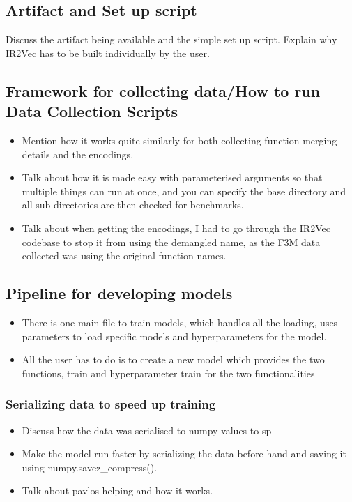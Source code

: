 \subsection{Artifact and Set up script}
Discuss the artifact being available and the simple set up script. Explain why IR2Vec has to be built individually by the user.

\subsection{Framework for collecting data/How to run Data Collection Scripts}
\begin{itemize}
    \item Mention how it works quite similarly for both collecting function merging details and the encodings.
    \item Talk about how it is made easy with parameterised arguments so that multiple things can run at once, and you can specify the base directory and all sub-directories are then checked for benchmarks.
    \item Talk about when getting the encodings, I had to go through the IR2Vec codebase to stop it from using the demangled name, as the F3M data collected was using the original function names.
\end{itemize}


\subsection{Pipeline for developing models}
\begin{itemize}
    \item There is one main file to train models, which handles all the loading, uses parameters to load specific models and hyperparameters for the model. 
    \item All the user has to do is to create a new model which provides the two functions, train and hyperparameter train for the two functionalities

\end{itemize}

\subsubsection{Serializing data to speed up training}
\begin{itemize}
    \item Discuss how the data was serialised to numpy values to sp
    \item Make the model run faster by serializing the data before hand and saving it using numpy.savez\_compress(). 
    \item Talk about pavlos helping and how it works.
\end{itemize}

